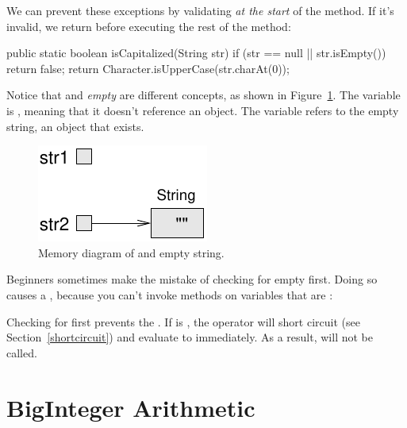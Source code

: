 We can prevent these exceptions by validating  {\em at the start} of the method.
If it's invalid, we return before executing the rest of the method:

\begin{code}
public static boolean isCapitalized(String str) {
    if (str == null || str.isEmpty()) {
        return false;
    }
    return Character.isUpperCase(str.charAt(0));
}
\end{code}

Notice that  and {\em empty} are different concepts, as shown in Figure~\ref{fig.nullempty}.
The variable  is , meaning that it doesn't reference an object.
The variable  refers to the empty string, an object that exists.

\begin{figure}[!ht]
\begin{center}
\includegraphics{figs/nullempty.pdf}
\caption{Memory diagram of  and empty string.}
\label{fig.nullempty}
\end{center}
\end{figure}

Beginners sometimes make the mistake of checking for empty first.
Doing so causes a , because you can't invoke methods on variables that are :

\begin{code}
if (str.isEmpty() || str == null) {    // wrong!
\end{code}


Checking for  first prevents the .
If  is , the \java{||} operator will short circuit (see Section~\ref{shortcircuit}) and evaluate to  immediately.
As a result,  will not be called.


\section{BigInteger Arithmetic}

